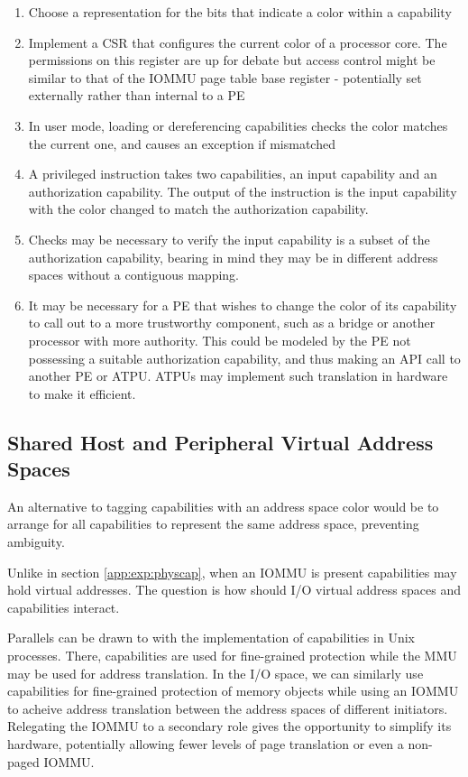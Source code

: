 \begin{enumerate}
\item Choose a representation for the bits that indicate a color within a capability
\item Implement a CSR that configures the current color of a processor core.  The
permissions on this register are up for debate but access control might be
similar to that of the IOMMU page table base register - potentially
set externally rather than internal to a PE
\item In user mode, loading or dereferencing capabilities checks the color
matches the current one, and causes an exception if mismatched
\item A privileged instruction takes two capabilities, an input capability
and an authorization capability.  The output of the instruction is the input
capability with the color changed to match the authorization capability.
\item Checks may be necessary to verify the input capability is a subset of the
authorization capability, bearing in mind they may be in different address
spaces without a contiguous mapping.
\item It may be necessary for a PE that wishes to change the color of its
capability to call out to a more trustworthy component, such as a bridge or
another processor with more authority.  This could be modeled by the PE not
possessing a suitable authorization capability, and thus making an API call to
another PE or ATPU.  ATPUs may implement such translation in hardware to
make it efficient.
\end{enumerate}


\subsection{Shared Host and Peripheral Virtual Address Spaces} %
An alternative to tagging capabilities with an address space color would be
to arrange for all capabilities to represent the same address space, preventing
ambiguity.

Unlike in section \ref{app:exp:physcap}, when an IOMMU is present capabilities
may hold virtual addresses.  The question is how should I/O virtual address
spaces and capabilities interact.

Parallels can be drawn to with the implementation of
capabilities in Unix processes.  There, capabilities are used for fine-grained
protection while the MMU may be used for address translation.
In the I/O space, we can similarly use capabilities for fine-grained
protection of memory objects while using an IOMMU to acheive address
translation between the address spaces of different initiators.  Relegating the
IOMMU to a secondary role gives the opportunity to
simplify its hardware, potentially allowing fewer levels of page translation
or even a non-paged IOMMU.

